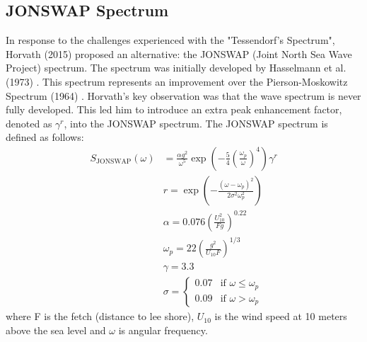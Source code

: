 \subsection{JONSWAP Spectrum}
In response to the challenges experienced with the "Tessendorf's Spectrum", Horvath (2015) \cite{horvath2015} proposed an alternative: the JONSWAP (Joint North Sea Wave Project) spectrum. The spectrum was initially developed by Hasselmann et al. (1973) \cite{hasselmann1973}. This spectrum represents an improvement over the Pierson-Moskowitz Spectrum (1964) \cite{pierson1964}. Horvath's key observation was that the wave spectrum is never fully developed. This led him to introduce an extra peak enhancement factor, denoted as $\gamma^r$, into the JONSWAP spectrum.
The JONSWAP spectrum is defined as follows:
\begin{equation}
    \begin{aligned}
        S_{\text{JONSWAP}}(\omega) &= \frac{\alpha g^{2}}{\omega^{5}} \exp \left(-\frac{5}{4} \left(\frac{\omega_{p}}{\omega}\right)^{4}\right) \gamma^{r} \\
        &r = \exp\left(-\frac{(\omega - \omega_p)^{2}}{2 \sigma^{2}\omega^{2}_p}\right) \\
        &\alpha = 0.076 \left( \frac{U^{2}_{10}}{Fg} \right)^{0.22} \\
        &\omega_p = 22 \left( \frac{g^{2}}{U_{10}F} \right)^{1/3} \\
        &\gamma = 3.3 \\
        &\sigma = 
        \begin{cases} 
        0.07 & \text{if } \omega \leq \omega_p \\
        0.09 & \text{if } \omega > \omega_p
        \end{cases}
    \end{aligned}
\end{equation}
where F is the fetch (distance to lee shore), $U_{10}$ is the wind speed at 10 meters above the sea level and $\omega$ is angular frequency.

